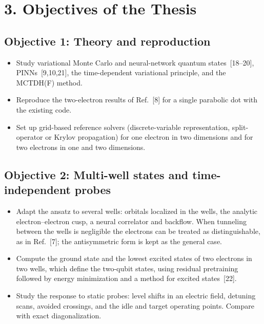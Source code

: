 \documentclass[12pt,a4paper]{article}
\begin{document}
\section*{3. Objectives of the Thesis}

\subsection*{Objective 1: Theory and reproduction}
\begin{itemize}
  \item Study variational Monte Carlo and neural-network quantum
  states~[18--20], PINNs~[9,10,21], the time-dependent variational
  principle, and the MCTDH(F) method.
  \item Reproduce the two-electron results of Ref.~[8] for a single
  parabolic dot with the existing code.
  \item Set up grid-based reference solvers (discrete-variable
  representation, split-operator or Krylov propagation) for one
  electron in two dimensions and for two electrons in one and two
  dimensions.
\end{itemize}

\subsection*{Objective 2: Multi-well states and time-independent probes}
\begin{itemize}
  \item Adapt the ansatz to several wells: orbitals localized in the
  wells, the analytic electron--electron cusp, a neural correlator
  and backflow.  When tunneling between the wells is negligible the
  electrons can be treated as distinguishable, as in Ref.~[7]; the
  antisymmetric form is kept as the general case.
  \item Compute the ground state and the lowest excited states of two
  electrons in two wells, which define the two-qubit states, using
  residual pretraining followed by energy minimization and a method
  for excited states~[22].
  \item Study the response to static probes: level shifts in an
  electric field, detuning scans, avoided crossings, and the idle and
  target operating points.  Compare with exact diagonalization.
\end{itemize}
\end{document}
